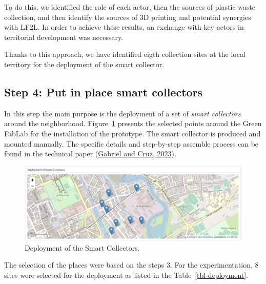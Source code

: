 \documentclass[
  11pt,
]{article}
\begin{document}
To do this, we identified the role of each actor, then the sources of
plastic waste collection, and then identify the sources of 3D printing
and potential synergies with LF2L. In order to achieve these results, an
exchange with key actors in territorial development was necessary.

Thanks to this approach, we have identified eigth collection sites at
the local territory for the deployment of the smart collector.

\hypertarget{step-4-put-in-place-smart-collectors}{%
\subsection{Step 4: Put in place smart
collectors}\label{step-4-put-in-place-smart-collectors}}

In this step the main purpose is the deployment of a set of \emph{smart
collectors} around the neighborhood. Figure~\ref{fig-sc-deployment}
presents the selected points around the Green FabLab for the
installation of the prototype. The smart collector is produced and
mounted manually. The specific details and step-by-step assemble process
can be found in the technical paper
(\protect\hyperlink{ref-gabriel2023}{Gabriel and Cruz, 2023}).

\begin{figure}[H]

{\centering \includegraphics{figures/SC/Deployment.png}

}

\caption{\label{fig-sc-deployment}Deployment of the Smart Collectors.}

\end{figure}

The selection of the places were based on the steps 3. For the
experimentation, 8 sites were selected for the deployment as listed in
the Table~\ref{tbl-deployment}.
\end{document}
